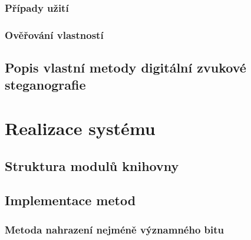 
\blindtext

\subsection*{Případy užití}
\label{sub:use-cases}


\blindtext

\subsection*{Ověřování vlastností}
\label{sub:method-property-verification}


\blindtext

\section{Popis vlastní metody digitální zvukové steganografie}
\label{sec:own-method-proposal}


\blindtext

\blindtext


\chapter{Realizace systému}
\label{cha:implementation}


\blindtext

\section{Struktura modulů knihovny}
\label{sec:modules}


\blindtext

\blindtext

\blindtext

\section{Implementace metod}
\label{sec:method-implementation}

\subsection*{Metoda nahrazení nejméně významného bitu}
\label{sub:lsb-implementation}

